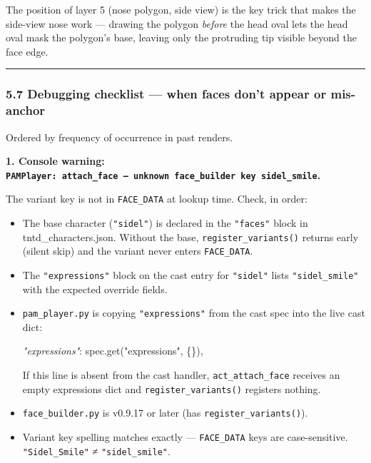 \documentclass[
  12pt,
  letterpaper,
]{book}
\newenvironment{Shaded}{}{}
\newcommand{\CommentTok}[1]{\textcolor[rgb]{0.38,0.63,0.69}{\textit{#1}}}
\newcommand{\NormalTok}[1]{#1}
\newcommand{\StringTok}[1]{\textcolor[rgb]{0.25,0.44,0.63}{#1}}
\begin{document}
The position of layer 5 (nose polygon, side view) is the key trick that
makes the side-view nose work --- drawing the polygon \emph{before} the
head oval lets the head oval mask the polygon's base, leaving only the
protruding tip visible beyond the face edge.

\begin{center}\rule{0.5\linewidth}{0.5pt}\end{center}

\subsubsection{5.7 Debugging checklist --- when faces don't appear or
mis-anchor}\label{debugging-checklist-when-faces-dont-appear-or-mis-anchor}

Ordered by frequency of occurrence in past renders.

\textbf{1. Console warning:
\texttt{PAMPlayer:\ attach\_face\ —\ unknown\ face\_builder\ key\ \textquotesingle{}sidel\_smile\textquotesingle{}}.}

The variant key is not in \texttt{FACE\_DATA} at lookup time. Check, in
order:

\begin{itemize}
\item
  The base character (\texttt{"sidel"}) is declared in the
  \texttt{"faces"} block in tntd\_characters.json. Without the base,
  \texttt{register\_variants()} returns early (silent skip) and the
  variant never enters \texttt{FACE\_DATA}.
\item
  The \texttt{"expressions"} block on the cast entry for
  \texttt{"sidel"} lists \texttt{"sidel\_smile"} with the expected
  override fields.
\item
  \texttt{pam\_player.py} is copying \texttt{"expressions"} from the
  cast spec into the live cast dict:

\begin{Shaded}
\begin{Highlighting}[]
\CommentTok{"expressions"}\NormalTok{: spec.get(}\StringTok{"expressions"}\NormalTok{, \{\}),}
\end{Highlighting}
\end{Shaded}

  If this line is absent from the cast handler,
  \texttt{act\_attach\_face} receives an empty expressions dict and
  \texttt{register\_variants()} registers nothing.
\item
  \texttt{face\_builder.py} is v0.9.17 or later (has
  \texttt{register\_variants()}).
\item
  Variant key spelling matches exactly --- \texttt{FACE\_DATA} keys are
  case-sensitive. \texttt{"Sidel\_Smile"} ≠ \texttt{"sidel\_smile"}.
\end{itemize}
\end{document}
